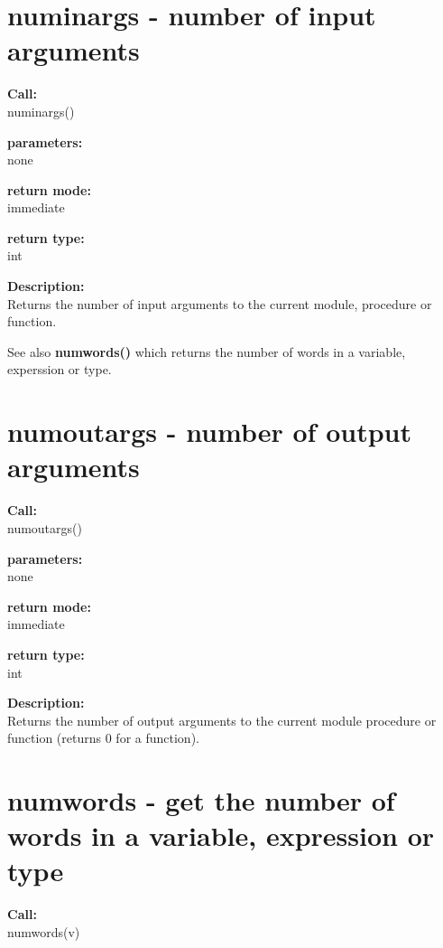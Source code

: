     \section{numinargs - number of input arguments}\label{sec:ifnuminargs}
        
        
        {\bf Call:} \\
        numinargs()
        
        {\bf parameters:} \\
        none
        
        {\bf return mode:} \\
        immediate

        {\bf return type:} \\
        int
        
        {\bf Description:} \\
        Returns the number of input arguments to the current module, procedure
        or function.

        See also {\bf numwords()}  which returns the
        number of words in a variable, experssion or type.


    \section{numoutargs - number of output arguments}\label{sec:ifnumoutargs}
        
        
        {\bf Call:} \\
        numoutargs()
        
        {\bf parameters:} \\
        none
        
        {\bf return mode:} \\
        immediate

        {\bf return type:} \\
        int
        
        {\bf Description:} \\
        Returns the number of output arguments to the current module procedure
        or function (returns 0 for a function).


    \section{numwords - get the number of words in a variable, expression or type}\label{sec:ifnumwords}
        
        {\bf Call:} \\
        numwords(v)
        
